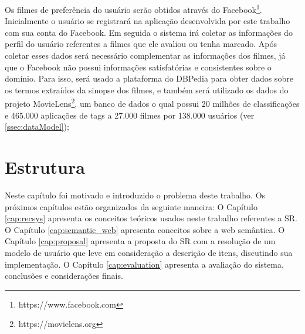 Os filmes de preferência do usuário serão obtidos através do Facebook\footnote{https://www.facebook.com}. Inicialmente o usuário se registrará na aplicação desenvolvida por este trabalho com sua conta do Facebook. Em seguida o sistema irá coletar as informações do perfil do usuário referentes a filmes que ele avaliou ou tenha marcado. Após coletar esses dados será necessário complementar as informações dos filmes, já que o Facebook não possui informações satisfatórias e consistentes sobre o domínio. Para isso, será usado a plataforma do DBPedia para obter dados sobre os termos extraídos da sinopse dos filmes, e também será utilizado os dados do projeto MovieLens\footnote{https://movielens.org}, um banco de dados o qual possui 20 milhões de classificações e 465.000 aplicações de tags a 27.000 filmes por 138.000 usuários (ver \ref{ssec:dataModel});

\section{Estrutura}
Neste capítulo foi motivado e introduzido o problema deste trabalho. Os próximos capítulos estão organizados da seguinte maneira: O Capítulo \ref{cap:recsys} apresenta os conceitos teóricos usados neste trabalho referentes a SR. O Capítulo \ref{cap:semantic_web} apresenta conceitos sobre a web semântica. O Capítulo \ref{cap:proposal} apresenta a proposta do SR com a resolução de um modelo de usuário que leve em consideração a descrição de itens, discutindo sua implementação. O Capítulo \ref{cap:evaluation} apresenta a avaliação do sistema, conclusões e considerações finais.